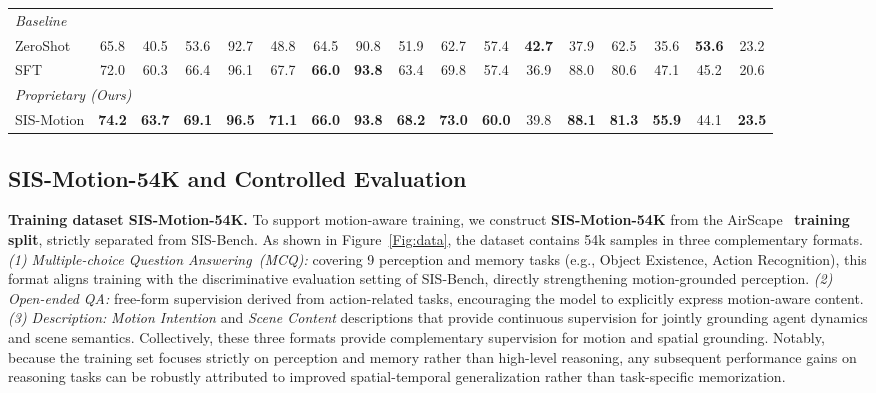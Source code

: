\documentclass[sigconf, screen, review, anonymous]{acmart}
\begin{document}
\begin{table}[t]
{\begin{tabular}{l|ccc|ccc|ccc|cc|c|cc|cc}
\multicolumn{17}{l}{\cellcolor[HTML]{ECF4FF}\textit{Baseline}} \\
ZeroShot & 65.8 & 40.5 & 53.6 & 92.7 & 48.8 & 64.5 & 90.8 & 51.9 & 62.7 & 57.4 & \textbf{42.7} & 37.9 & 62.5 & 35.6 & \textbf{53.6} & 23.2 \\
SFT & 72.0 & 60.3 & 66.4 & 96.1 & 67.7 & \textbf{66.0} & \textbf{93.8} & 63.4 & 69.8 & 57.4 & 36.9 & 88.0 & 80.6 & 47.1 & 45.2 & 20.6 \\
\hline

\multicolumn{17}{l}{\cellcolor[HTML]{ECF4FF}\textit{Proprietary (Ours)}} \\
SIS-Motion & \textbf{74.2} & \textbf{63.7} & \textbf{69.1} & \textbf{96.5} & \textbf{71.1} & \textbf{66.0} & \textbf{93.8} & \textbf{68.2} & \textbf{73.0} & \textbf{60.0} & 39.8 & \textbf{88.1} & \textbf{81.3} & \textbf{55.9} & 44.1 & \textbf{23.5} \\
\hline
\end{tabular}
}
\end{table}




\subsection{SIS-Motion-54K and Controlled Evaluation}

\noindent \textbf{Training dataset SIS-Motion-54K.}
To support motion-aware training, we construct \textbf{SIS-Motion-54K} from the AirScape~\cite{zhao2025airscape} \textbf{training split}, strictly separated from SIS-Bench. As shown in Figure~\ref{Fig:data}, the dataset contains 54k samples in three complementary formats. \textit{(1) Multiple-choice Question Answering~(MCQ):} covering 9 perception and memory tasks (e.g., Object Existence, Action Recognition), this format aligns training with the discriminative evaluation setting of SIS-Bench, directly strengthening motion-grounded perception. \textit{(2) Open-ended QA:} free-form supervision derived from action-related tasks, encouraging the model to explicitly express motion-aware content. \textit{(3) Description:} \textit{Motion Intention} and \textit{Scene Content} descriptions that provide continuous supervision for jointly grounding agent dynamics and scene semantics.
Collectively, these three formats provide complementary supervision for motion and spatial grounding. Notably, because the training set focuses strictly on perception and memory rather than high-level reasoning, any subsequent performance gains on reasoning tasks can be robustly attributed to improved spatial-temporal generalization rather than task-specific memorization.
\end{document}
